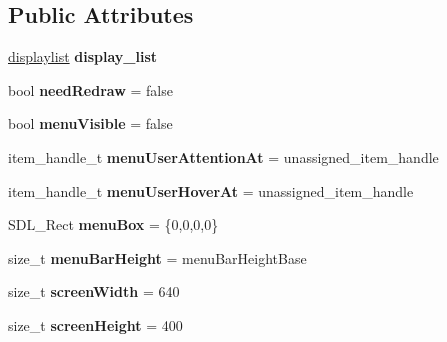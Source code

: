 \subsection*{Public Attributes}
\begin{DoxyCompactItemize}
\item 
\hypertarget{classDOSBoxMenu_ac2c38f4e2dffd87211dafa2d42a5230e}{\hyperlink{classDOSBoxMenu_1_1displaylist}{displaylist} {\bfseries display\-\_\-list}}\label{classDOSBoxMenu_ac2c38f4e2dffd87211dafa2d42a5230e}

\item 
\hypertarget{classDOSBoxMenu_ae649bc277ce09d96bda55f16bdf05fd8}{bool {\bfseries need\-Redraw} = false}\label{classDOSBoxMenu_ae649bc277ce09d96bda55f16bdf05fd8}

\item 
\hypertarget{classDOSBoxMenu_a3fde7a3e9bc708d1e53b6adbe3130c5c}{bool {\bfseries menu\-Visible} = false}\label{classDOSBoxMenu_a3fde7a3e9bc708d1e53b6adbe3130c5c}

\item 
\hypertarget{classDOSBoxMenu_adf17c446d1d90dd667a967c5a126ab87}{item\-\_\-handle\-\_\-t {\bfseries menu\-User\-Attention\-At} = unassigned\-\_\-item\-\_\-handle}\label{classDOSBoxMenu_adf17c446d1d90dd667a967c5a126ab87}

\item 
\hypertarget{classDOSBoxMenu_ad89744fd8a092b86226fa22a3159a5b3}{item\-\_\-handle\-\_\-t {\bfseries menu\-User\-Hover\-At} = unassigned\-\_\-item\-\_\-handle}\label{classDOSBoxMenu_ad89744fd8a092b86226fa22a3159a5b3}

\item 
\hypertarget{classDOSBoxMenu_ab42d2a5d630ccaf58e17eb2cb77c87d8}{S\-D\-L\-\_\-\-Rect {\bfseries menu\-Box} = \{0,0,0,0\}}\label{classDOSBoxMenu_ab42d2a5d630ccaf58e17eb2cb77c87d8}

\item 
\hypertarget{classDOSBoxMenu_a4355c3f8b8295d1c23ff3c69da8a3195}{size\-\_\-t {\bfseries menu\-Bar\-Height} = menu\-Bar\-Height\-Base}\label{classDOSBoxMenu_a4355c3f8b8295d1c23ff3c69da8a3195}

\item 
\hypertarget{classDOSBoxMenu_af582488f184003eb0536033e930f757c}{size\-\_\-t {\bfseries screen\-Width} = 640}\label{classDOSBoxMenu_af582488f184003eb0536033e930f757c}

\item 
\hypertarget{classDOSBoxMenu_ab35930b928d83583e8bfe4868b9ac3a3}{size\-\_\-t {\bfseries screen\-Height} = 400}\label{classDOSBoxMenu_ab35930b928d83583e8bfe4868b9ac3a3}


\end{DoxyCompactItemize}
